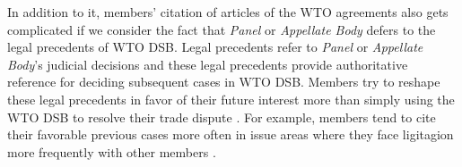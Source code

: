 In addition to it, members' citation of articles of the WTO agreements also gets complicated
if we consider the fact that \textit{Panel} or \textit{Appellate Body} defers to the legal precedents of WTO DSB.
Legal precedents refer to \textit{Panel} or \textit{Appellate Body}'s judicial decisions
and these legal precedents provide authoritative reference
for deciding subsequent cases in WTO DSB.
Members try to reshape these legal precedents
in favor of their future interest more than
simply using the WTO DSB to resolve their trade
dispute \citep{pelc}. For example,
members tend to cite their
favorable previous cases more often in issue areas where they face ligitagion more frequently with other members
\citep{latent}.


